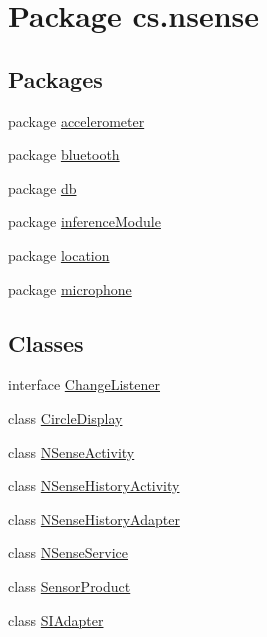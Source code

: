 \hypertarget{namespacecs_1_1nsense}{\section{Package cs.\-nsense}
\label{namespacecs_1_1nsense}
}
\subsection*{Packages}
\begin{DoxyCompactItemize}
\item 
package \hyperlink{namespacecs_1_1nsense_1_1accelerometer}{accelerometer}
\item 
package \hyperlink{namespacecs_1_1nsense_1_1bluetooth}{bluetooth}
\item 
package \hyperlink{namespacecs_1_1nsense_1_1db}{db}
\item 
package \hyperlink{namespacecs_1_1nsense_1_1inference_module}{inference\-Module}
\item 
package \hyperlink{namespacecs_1_1nsense_1_1location}{location}
\item 
package \hyperlink{namespacecs_1_1nsense_1_1microphone}{microphone}
\end{DoxyCompactItemize}
\subsection*{Classes}
\begin{DoxyCompactItemize}
\item 
interface \hyperlink{interfacecs_1_1nsense_1_1_change_listener}{Change\-Listener}
\item 
class \hyperlink{classcs_1_1nsense_1_1_circle_display}{Circle\-Display}
\item 
class \hyperlink{classcs_1_1nsense_1_1_n_sense_activity}{N\-Sense\-Activity}
\item 
class \hyperlink{classcs_1_1nsense_1_1_n_sense_history_activity}{N\-Sense\-History\-Activity}
\item 
class \hyperlink{classcs_1_1nsense_1_1_n_sense_history_adapter}{N\-Sense\-History\-Adapter}
\item 
class \hyperlink{classcs_1_1nsense_1_1_n_sense_service}{N\-Sense\-Service}
\item 
class \hyperlink{classcs_1_1nsense_1_1_sensor_product}{Sensor\-Product}
\item 
class \hyperlink{classcs_1_1nsense_1_1_s_i_adapter}{S\-I\-Adapter}
\end{DoxyCompactItemize}


